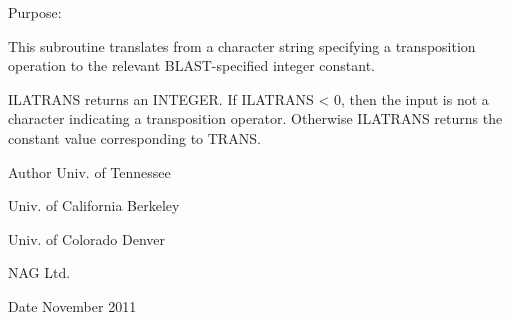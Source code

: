  \begin{DoxyParagraph}{Purpose\+: }
\begin{DoxyVerb} This subroutine translates from a character string specifying a
 transposition operation to the relevant BLAST-specified integer
 constant.

 ILATRANS returns an INTEGER.  If ILATRANS < 0, then the input is not
 a character indicating a transposition operator.  Otherwise ILATRANS
 returns the constant value corresponding to TRANS.\end{DoxyVerb}
 
\end{DoxyParagraph}
\begin{DoxyAuthor}{Author}
Univ. of Tennessee 

Univ. of California Berkeley 

Univ. of Colorado Denver 

N\+A\+G Ltd. 
\end{DoxyAuthor}
\begin{DoxyDate}{Date}
November 2011 
\end{DoxyDate}
